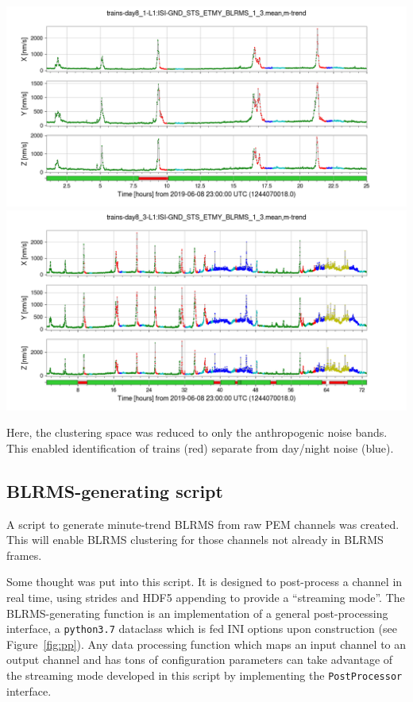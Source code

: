 \documentclass[colorlinks=true,pdfstartview=FitV,linkcolor=blue,
            citecolor=red,urlcolor=magenta]{ligodoc}
\begin{document}
\rightfigures
{
  \includegraphics[width=\textwidth]{assets/report1/trains-day8_1-L1:ISI-GND_STS_ETMY_BLRMS_1_3mean,m-trend.png}\\
  \includegraphics[width=\textwidth]{assets/report1/trains-day8_3-L1:ISI-GND_STS_ETMY_BLRMS_1_3mean,m-trend.png}
}{
  \caption{Here, the clustering space was reduced to only the anthropogenic noise bands. This enabled identification of trains (red) separate from day/night noise (blue).}\label{fig:trains}
}

\subsection{BLRMS-generating script}
A script to generate minute-trend BLRMS from raw PEM channels was created. This will enable BLRMS clustering for those channels not already in BLRMS frames.

Some thought was put into this script.
It is designed to post-process a channel in real time, using strides and HDF5 appending to provide a ``streaming mode''.
The BLRMS-generating function is an implementation of a general post-processing interface, a \texttt{python3.7} dataclass which is fed INI options upon construction (see Figure~\ref{fig:pp}).
Any data processing function which maps an input channel to an output channel and has tons of configuration parameters can take advantage of the streaming mode developed in this script by implementing the \texttt{PostProcessor} interface.
\end{document}
